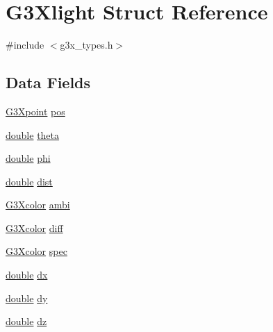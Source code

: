\hypertarget{struct_g3_xlight}{}\section{G3\+Xlight Struct Reference}
\label{struct_g3_xlight}


{\ttfamily \#include $<$g3x\+\_\+types.\+h$>$}

\subsection*{Data Fields}
\begin{DoxyCompactItemize}
\item 
\hyperlink{g3x__types_8h_a656d1bc95bdef5a54decde84cfe9f60a}{G3\+Xpoint} \hyperlink{struct_g3_xlight_a853e10d13368ee8dc352141cce54f7f8}{pos}
\item 
\hyperlink{g3x__transfo_8h_a89b2b23e407882a535d835574a7912e1}{double} \hyperlink{struct_g3_xlight_aca81c35c21e3a5f7f3a8d24504e76664}{theta}
\item 
\hyperlink{g3x__transfo_8h_a89b2b23e407882a535d835574a7912e1}{double} \hyperlink{struct_g3_xlight_adae8d8a6ff28515e505bb1c07f2b33c8}{phi}
\item 
\hyperlink{g3x__transfo_8h_a89b2b23e407882a535d835574a7912e1}{double} \hyperlink{struct_g3_xlight_accf93555161c9eedf006462a228af523}{dist}
\item 
\hyperlink{g3x__types_8h_afc484f732c62f1a0417034e535352e30}{G3\+Xcolor} \hyperlink{struct_g3_xlight_a2f38453a2432f73c432d6d6c71cf630d}{ambi}
\item 
\hyperlink{g3x__types_8h_afc484f732c62f1a0417034e535352e30}{G3\+Xcolor} \hyperlink{struct_g3_xlight_ab37a07844bff7802809eb22db0fb0b16}{diff}
\item 
\hyperlink{g3x__types_8h_afc484f732c62f1a0417034e535352e30}{G3\+Xcolor} \hyperlink{struct_g3_xlight_a937aebfb58ac178ae9636be149315f36}{spec}
\item 
\hyperlink{g3x__transfo_8h_a89b2b23e407882a535d835574a7912e1}{double} \hyperlink{struct_g3_xlight_a229d11aff11a7482259d1296b9b70b8a}{dx}
\item 
\hyperlink{g3x__transfo_8h_a89b2b23e407882a535d835574a7912e1}{double} \hyperlink{struct_g3_xlight_a9deb6f886b19d50e714d890c3c268efc}{dy}
\item 
\hyperlink{g3x__transfo_8h_a89b2b23e407882a535d835574a7912e1}{double} \hyperlink{struct_g3_xlight_a5a198de8c3f38514f4e55231aa69cd10}{dz}
\end{DoxyCompactItemize}



